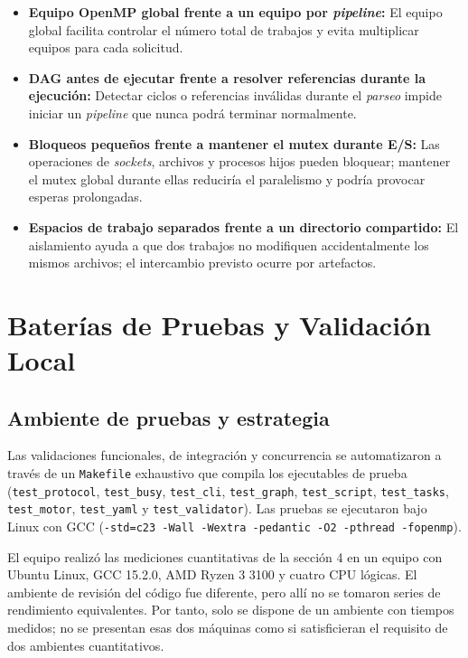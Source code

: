 \documentclass[12pt,a4paper]{article}
\newcommand{\code}[1]{\texttt{#1}}
\begin{document}
\begin{itemize}
  \item \textbf{Equipo OpenMP global frente a un equipo por \textit{pipeline}:} El equipo global facilita controlar el número total de trabajos y evita multiplicar equipos para cada solicitud.
  \item \textbf{DAG antes de ejecutar frente a resolver referencias durante la ejecución:} Detectar ciclos o referencias inválidas durante el \textit{parseo} impide iniciar un \textit{pipeline} que nunca podrá terminar normalmente.
  \item \textbf{Bloqueos pequeños frente a mantener el mutex durante E/S:} Las operaciones de \textit{sockets}, archivos y procesos hijos pueden bloquear; mantener el mutex global durante ellas reduciría el paralelismo y podría provocar esperas prolongadas.
  \item \textbf{Espacios de trabajo separados frente a un directorio compartido:} El aislamiento ayuda a que dos trabajos no modifiquen accidentalmente los mismos archivos; el intercambio previsto ocurre por artefactos.
\end{itemize}

\section{Baterías de Pruebas y Validación Local}

\subsection{Ambiente de pruebas y estrategia}

Las validaciones funcionales, de integración y concurrencia se automatizaron a través de un \code{Makefile} exhaustivo que compila los ejecutables de prueba (\code{test\_protocol}, \code{test\_busy}, \code{test\_cli}, \code{test\_graph}, \code{test\_script}, \code{test\_tasks}, \code{test\_motor}, \code{test\_yaml} y \code{test\_validator}). Las pruebas se ejecutaron bajo Linux con GCC (\code{-std=c23 -Wall -Wextra -pedantic -O2 -pthread -fopenmp}).

El equipo realizó las mediciones cuantitativas de la sección 4 en un equipo con Ubuntu Linux, GCC 15.2.0, AMD Ryzen 3 3100 y cuatro CPU lógicas. El ambiente de revisión del código fue diferente, pero allí no se tomaron series de rendimiento equivalentes. Por tanto, solo se dispone de un ambiente con tiempos medidos; no se presentan esas dos máquinas como si satisficieran el requisito de dos ambientes cuantitativos.
\end{document}
